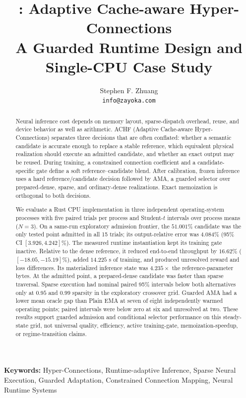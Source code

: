 \documentclass{article}
\title{
\achf{}: Adaptive Cache-aware Hyper-Connections\\
A Guarded Runtime Design and Single-CPU Case Study
}
\author{
Stephen F. Zhuang\\
\texttt{info@zayoka.com}
}
\providecommand{\keywords}[1]{\par\noindent\textbf{Keywords: }#1}
\newcommand{\achf}{\textsc{ACHF}}
\newcommand{\ama}{\textsc{AMA}}
\begin{document}
\maketitle

\begin{abstract}
Neural inference cost depends on memory layout, sparse-dispatch overhead, reuse,
and device behavior as well as arithmetic. \achf{} (Adaptive Cache-aware
Hyper-Connections) separates three decisions that are often conflated: whether
a semantic candidate is accurate enough to replace a stable reference,
which equivalent physical realization should execute an admitted candidate,
and whether an exact output may be reused. During training, a constrained
connection coefficient and a candidate-specific gate define a soft
reference--candidate blend. After calibration, frozen inference uses a hard
reference/candidate decision followed by \ama{}, a guarded selector over
prepared-dense, sparse, and ordinary-dense realizations. Exact memoization is
orthogonal to both decisions.

We evaluate a Rust CPU implementation in three independent operating-system
processes with five paired trials per process and Student-$t$ intervals over
process means ($N=3$). On a same-run exploratory admission frontier, the
$51.001\%$ candidate was the only tested point admitted in all 15 trials; its
output-relative error was $4.084\%$ (95\% CI $[3.926,4.242]\%$). The measured
runtime instantiation kept its training gate inactive. Relative to the dense
reference, it reduced end-to-end throughput by $16.62\%$
($[-18.05,-15.19]\%$), added $14.225$ s of training, and produced unresolved
reward and loss differences. Its materialized inference state was $4.235\times$
the reference-parameter bytes. At the admitted point, a prepared-dense
candidate was faster than sparse traversal. Sparse execution had nominal
paired 95\% intervals below both alternatives only at $0.95$ and $0.99$
sparsity in the exploratory crossover grid.
Guarded \ama{} had a lower mean oracle gap than Plain EMA at seven of eight
independently warmed operating points; paired intervals were below zero at six
and unresolved at two. These results support guarded admission and conditional
selector performance on this steady-state grid, not universal quality,
efficiency, active training-gate, memoization-speedup, or regime-transition
claims.
\end{abstract}

\keywords{
Hyper-Connections,
Runtime-adaptive Inference,
Sparse Neural Execution,
Guarded Adaptation,
Constrained Connection Mapping,
Neural Runtime Systems
}
\end{document}
